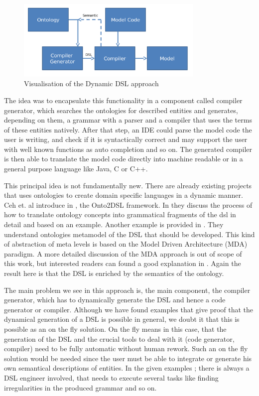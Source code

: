 \begin{figure}[htbp]
	\centering
	\includegraphics[width=0.8\textwidth]{pics/generation_of_a_dsl/binding1.png}
	\caption{Visualisation of the Dynamic DSL approach \label{fig:visualisation_dyn_dsl}}	
\end{figure}
\par
The idea was to encapsulate this functionality in a component called compiler generator, which searches the ontologies for described entities and generates, depending on them, a grammar with a parser and a compiler that uses the terms of these entities natively. After that step, an IDE could parse the model code the user is writing, and check if it is syntactically correct and may support the user with well known functions as auto completion and so on. The generated compiler is then able to translate the model code directly into machine readable or in a general purpose language like Java, C or C++.
\par
This principal idea is not fundamentally new. There are already existing projects that uses ontologies to create domain specific languages in a dynamic manner. Ceh et. al introduce in \autocite{ontology:ontology2dsl}, \autocite{ontology:onto_in_dsl_dev} the Onto2DSL framework. In \autocite[192]{ontology:onto_in_dsl_dev} they discuss the process of how to translate ontology concepts into grammatical fragments of the dsl in detail and based on an example. Another example is provided in \autocite{ontology:combining_dsl_onto}. They understand ontologies metamodel of the DSL that should be developed. This kind of abstraction of meta levels is based on the Model Driven Architecture (MDA) paradigm. A  more detailed discussion of the MDA approach is out of scope of this work, but interested readers can found a good explanation in \autocite{dsl:mda}. Again the result here is that the DSL is enriched by the semantics of the ontology.
\par
The main problem we see in this approach is, the main component, the compiler generator, which has to dynamically generate the DSL and hence a code generator or compiler. Although we have found examples that give proof that the dynamical generation of a DSL is possible in general, we doubt it that this is possible as an on the fly solution. On the fly means in this case, that the generation of the DSL and the crucial tools to deal with it (code generator, compiler) need to be fully automatic without human rework. Such an on the fly solution would be needed since the user must be able to integrate or generate his own semantical descriptions of entities. In the given examples \autocite{ontology:ontology2dsl}; \autocite{ontology:onto_in_dsl_dev} there is always a DSL engineer involved, that needs to execute several tasks like finding irregularities in the produced grammar and so on.

